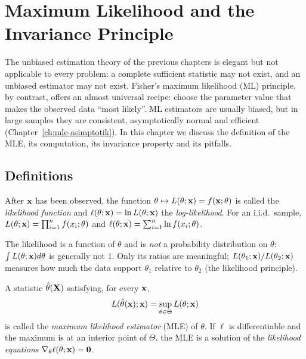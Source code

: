 \documentclass[main.tex]{subfiles}
\begin{document}
\chapter{Maximum Likelihood and the Invariance Principle}\label{ch:mle}

The unbiased estimation theory of the previous chapters is elegant but not applicable to every problem: a complete sufficient statistic may not exist, and an unbiased estimator may not exist. Fisher's maximum likelihood (ML) principle, by contrast, offers an almost universal recipe: choose the parameter value that makes the observed data ``most likely''. ML estimators are usually biased, but in large samples they are consistent, asymptotically normal and efficient (Chapter~\ref{ch:mle-asimptotik}). In this chapter we discuss the definition of the MLE, its computation, its invariance property and its pitfalls.

\section{Definitions}

\begin{definition}
After $\mathbf{x}$ has been observed, the function $\theta\mapsto L(\theta;\mathbf{x})=f(\mathbf{x};\theta)$ is called the \emph{likelihood function} and $\ell(\theta;\mathbf{x})=\ln L(\theta;\mathbf{x})$ the \emph{log-likelihood}. For an i.i.d.\ sample, $L(\theta;\mathbf{x})=\prod_{i=1}^nf(x_i;\theta)$ and $\ell(\theta;\mathbf{x})=\sum_{i=1}^n\ln f(x_i;\theta)$.
\end{definition}

\begin{remark}
The likelihood is a function of $\theta$ and is \emph{not} a probability distribution on $\theta$: $\int L(\theta;\mathbf{x})d\theta$ is generally not $1$. Only its ratios are meaningful; $L(\theta_1;\mathbf{x})/L(\theta_2;\mathbf{x})$ measures how much the data support $\theta_1$ relative to $\theta_2$ (the likelihood principle).
\end{remark}

\begin{definition}
A statistic $\hat\theta(\mathbf{X})$ satisfying, for every $\mathbf{x}$,
\[
L(\hat\theta(\mathbf{x});\mathbf{x})=\sup_{\theta\in\Theta}L(\theta;\mathbf{x})
\]
is called the \emph{maximum likelihood estimator} (MLE) of $\theta$. If $\ell$ is differentiable and the maximum is at an interior point of $\Theta$, the MLE is a solution of the \emph{likelihood equations} $\nabla_\theta\ell(\theta;\mathbf{x})=\mathbf 0$.
\end{definition}
\end{document}

